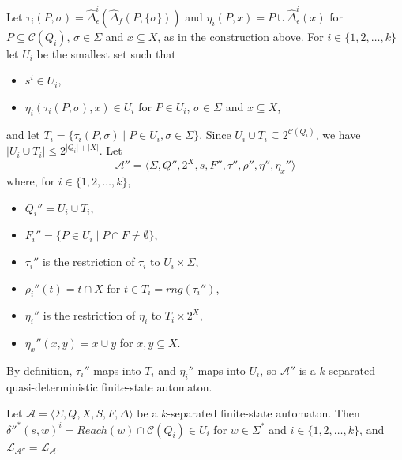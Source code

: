 Let $\tau_i(P, \sigma) = \hat{\Delta}_\epsilon^i(\hat{\Delta}_f(P, \{ \sigma \}))$ and
$\eta_i(P, x) = P \cup \hat{\Delta}_\epsilon^i(x)$ for $P \subseteq \mathcal{C}(Q_i)$,
$\sigma \in \Sigma$ and $x \subseteq X$, as in the construction above. For $i \in \{ 1,
2, \ldots, k \}$ let $U_i$ be the smallest set such that
\begin{itemize}
  \item $s^i \in U_i$,
  \item $\eta_i(\tau_i(P, \sigma), x) \in U_i$ for $P \in U_i$, $\sigma \in \Sigma$ and
    $x \subseteq X$,
\end{itemize}
and let $T_i = \{ \tau_i(P, \sigma) \mid P \in U_i, \sigma \in \Sigma \}$. Since $U_i
\cup T_i \subseteq 2^{\mathcal{C}(Q_i)}$, we have $|U_i \cup T_i| \leq 2^{|Q_i| +
|X|}$. Let
\begin{equation*}
  \mathcal{A}'' = \langle \Sigma, Q'', 2^X, s, F'', \tau'', \rho'', \eta'', \eta_x''
  \rangle
\end{equation*}
where, for $i \in \{ 1, 2, \ldots, k \}$,
\begin{itemize}
  \item $Q_i'' = U_i \cup T_i$,
  \item $F_i'' = \{ P \in U_i \mid P \cap F \neq \emptyset \}$,
  \item $\tau_i''$ is the restriction of $\tau_i$ to $U_i \times \Sigma$,
  \item $\rho_i''(t) = t \cap X$ for $t \in T_i = rng(\tau_i'')$,
  \item $\eta_i''$ is the restriction of $\eta_i$ to $T_i \times 2^X$,
  \item $\eta_x''(x, y) = x \cup y$ for $x, y \subseteq X$.
\end{itemize}
By definition, $\tau_i''$ maps into $T_i$ and $\eta_i''$ maps into $U_i$, so
$\mathcal{A}''$ is a $k$-separated quasi-deterministic finite-state automaton.

\begin{lemma}\label{lem:quasidet_components}
  Let $\mathcal{A} = \langle \Sigma, Q, X, S, F, \Delta \rangle$ be a $k$-separated
  finite-state automaton. Then $\delta''^*(s, w)^i = Reach(w) \cap \mathcal{C}(Q_i) \in
  U_i$ for $w \in \Sigma^*$ and $i \in \{ 1, 2, \ldots, k \}$, and
  $\mathcal{L}_{\mathcal{A}''} = \mathcal{L}_\mathcal{A}$.
\end{lemma}


